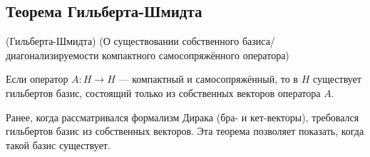 \documentclass[12pt]{article}
\begin{document}
	\subsection{Теорема Гильберта-Шмидта}

		\begin{theorem}
			(Гильберта-Шмидта) (О существовании {\color{gray}собственного} 
			базиса/диагонализируемости компактного самосопряжённого оператора)
		
			Если оператор $A : H \rightarrow H$ --- компактный и самосопряжённый, то в $H$ существует гильбертов 
			базис, состоящий только из собственных векторов оператора $A$.
		\end{theorem}
		Ранее, когда рассматривался формализм Дирака (бра- и кет-векторы), требовался гильбертов базис из
		собственных векторов. Эта теорема позволяет показать, когда такой базис существует.
\end{document}
